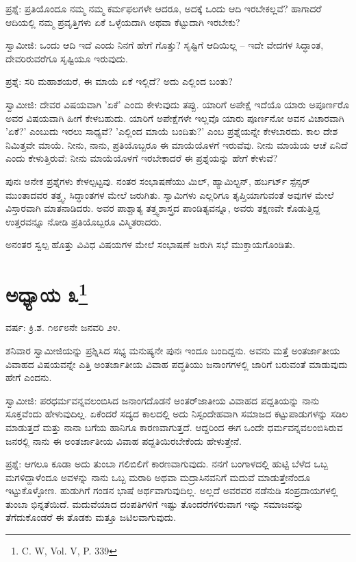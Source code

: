 ಪ್ರಶ್ನೆ: ಪ್ರತಿಯೊಂದೂ ನಮ್ಮ ನಮ್ಮ ಕರ್ಮಫಲಗಳೇ ಆದರೂ, ಅದಕ್ಕೆ ಒಂದು ಆದಿ ಇರಬೇಕಲ್ಲವೆ? ಹಾಗಾದರೆ ಆದಿಯಲ್ಲಿ ನಮ್ಮ ಪ್ರವೃತ್ತಿಗಳು ಏಕೆ ಒಳ್ಳೆಯದಾಗಿ ಅಥವಾ ಕೆಟ್ಟುದಾಗಿ ಇರಬೇಕು?

ಸ್ವಾಮೀಜಿ: ಒಂದು ಆದಿ ಇದೆ ಎಂದು ನಿನಗೆ ಹೇಗೆ ಗೊತ್ತು? ಸೃಷ್ಟಿಗೆ ಆದಿಯಿಲ್ಲ – ಇದೇ ವೇದಗಳ ಸಿದ್ಧಾಂತ, ದೇವರಿರುವರೆಗೂ ಸೃಷ್ಟಿಯೂ ಇರುವುದು.

ಪ್ರಶ್ನೆ: ಸರಿ ಮಹಾಶಯರೆ, ಈ ಮಾಯೆ ಏಕೆ ಇಲ್ಲಿದೆ? ಅದು ಎಲ್ಲಿಂದ ಬಂತು?

ಸ್ವಾಮೀಜಿ: ದೇವರ ವಿಷಯವಾಗಿ 'ಏಕೆ' ಎಂದು ಕೇಳುವುದು ತಪ್ಪು. ಯಾರಿಗೆ ಅಪೇಕ್ಷೆ ಇದೆಯೊ ಯಾರು ಅಪೂರ್ಣರೊ ಅವರ ವಿಷಯವಾಗಿ ಹೀಗೆ ಕೇಳಬಹುದು. ಯಾರಿಗೆ ಅಪೇಕ್ಷೆಗಳೇ ಇಲ್ಲವೊ ಯಾರು ಪೂರ್ಣನೋ ಅವನ ವಿಚಾರವಾಗಿ 'ಏಕೆ?' ಎಂಬುದು ಇರಲು ಸಾಧ್ಯವೆ? 'ಎಲ್ಲಿಂದ ಮಾಯೆ ಬಂದಿತು?' ಎಂಬ ಪ್ರಶ್ನೆಯನ್ನೇ ಕೇಳಬಾರದು. ಕಾಲ ದೇಶ ನಿಮಿತ್ತವೇ ಮಾಯೆ. ನೀನು, ನಾನು, ಪ್ರತಿಯೊಬ್ಬರೂ ಈ ಮಾಯೆಯೊಳಗೆ ಇರುವೆವು. ನೀನು ಮಾಯೆಯ ಆಚೆ ಏನಿದೆ ಎಂದು ಕೇಳುತ್ತಿರುವೆ: ನೀನು ಮಾಯೆಯೊಳಗೆ ಇರಬೇಕಾದರೆ ಈ ಪ್ರಶ್ನೆಯನ್ನು ಹೇಗೆ ಕೇಳುವೆ?

ಪುನಃ ಅನೇಕ ಪ್ರಶ್ನೆಗಳು ಕೇಳಲ್ಪಟ್ಟವು. ನಂತರ ಸಂಭಾಷಣೆಯು ಮಿಲ್, ಹ್ಯಾಮಿಲ್ಟನ್, ಹರ್ಬರ್ಟ್ ಸ್ಪೆನ್ಸರ್ ಮುಂತಾದವರ ತತ್ತ್ವ, ಸಿದ್ಧಾಂತಗಳ ಮೇಲೆ ಜರುಗಿತು. ಸ್ವಾಮಿಗಳು ಎಲ್ಲರಿಗೂ ತೃಪ್ತಿಯಾಗುವಂತೆ ಅವುಗಳ ಮೇಲೆ ವಿಸ್ತಾರವಾಗಿ ಮಾತನಾಡಿದರು. ಅವರ ಪಾಶ್ಚಾತ್ಯ ತತ್ತ್ವಶಾಸ್ತ್ರದ ಪಾಂಡಿತ್ಯವನ್ನೂ, ಅವರು ತಕ್ಷಣವೇ ಕೊಡುತ್ತಿದ್ದ ಉತ್ತರವನ್ನೂ ನೋಡಿ ಪ್ರತಿಯೊಬ್ಬರೂ ವಿಸ್ಮಿತರಾದರು.

ಅನಂತರ ಸ್ವಲ್ಪ ಹೊತ್ತು ವಿವಿಧ ವಿಷಯಗಳ ಮೇಲೆ ಸಂಭಾಷಣೆ ಜರುಗಿ ಸಭೆ ಮುಕ್ತಾಯಗೊಂಡಿತು.

\newpage

\chapter[ಅಧ್ಯಾಯ ೩]{ಅಧ್ಯಾಯ ೩\protect\footnote{\engfoot{} C. W, Vol. V, P. 339}}

\begin{center}
ವರ್ಷ: ಕ್ರಿ.ಶ. ೧೮೯೮ನೇ ಜನವರಿ ೨೪.
\end{center}

ಶನಿವಾರ ಸ್ವಾಮೀಜಿಯನ್ನು ಪ್ರಶ್ನಿಸಿದ ಸಭ್ಯ ಮನುಷ್ಯನೇ ಪುನಃ ಇಂದೂ ಬಂದಿದ್ದನು. ಅವನು ಮತ್ತೆ ಅಂತರ್ಜಾತೀಯ ವಿವಾಹದ ವಿಷಯವನ್ನೇ ಎತ್ತಿ ಅಂತರ್ಜಾತೀಯ ವಿವಾಹ ಪದ್ಧತಿಯು ಜನಾಂಗಗಳಲ್ಲಿ ಜಾರಿಗೆ ಬರುವಂತೆ ಮಾಡುವುದು ಹೇಗೆ ಎಂದನು.

ಸ್ವಾಮೀಜಿ: ಪರಧರ್ಮವನ್ನವಲಂಬಿಸಿದ ಜನಾಂಗದೊಡನೆ ಅಂತರ್‌ಜಾತೀಯ ವಿವಾಹದ ಪದ್ದತಿಯನ್ನು ನಾನು ಸೂಕ್ತವೆಂದು ಹೇಳುವುದಿಲ್ಲ. ಏಕೆಂದರೆ ಸದ್ಯದ ಕಾಲದಲ್ಲಿ ಅದು ನಿಸ್ಸಂದೇಹವಾಗಿ ಸಮಾಜದ ಕಟ್ಟುಪಾಡುಗಳನ್ನು ಸಡಿಲ ಮಾಡುತ್ತದೆ ಮತ್ತು ನಾನಾ ಬಗೆಯ ಹಾನಿಗೂ ಕಾರಣವಾಗುತ್ತದೆ. ಆದ್ದರಿಂದ ಈಗ ಒಂದೇ ಧರ್ಮವನ್ನವಲಂಬಿಸಿರುವ ಜನರಲ್ಲಿ ನಾನು ಈ ಅಂತರ್ಜಾತೀಯ ವಿವಾಹ ಪದ್ದತಿಯಿರಬೇಕೆಂದು ಹೇಳುತ್ತೇನೆ.

ಪ್ರಶ್ನೆ: ಆಗಲೂ ಕೂಡಾ ಅದು ತುಂಬಾ ಗಲಿಬಿಲಿಗೆ ಕಾರಣವಾಗುವುದು. ನನಗೆ ಬಂಗಾಳದಲ್ಲಿ ಹುಟ್ಟಿ ಬೆಳೆದ ಒಬ್ಬ ಮಗಳಿದ್ದಾಳೆಂದೂ ಅವಳನ್ನು ನಾನು ಒಬ್ಬ ಮರಾಠಿ ಅಥವಾ ಮದ್ರಾಸಿನವನಿಗೆ ಮದುವೆ ಮಾಡುತ್ತೇನೆಂದೂ ಇಟ್ಟುಕೊಳ್ಳೋಣ. ಹುಡುಗಿಗೆ ಗಂಡನ ಭಾಷೆ ಅರ್ಥವಾಗುವುದಿಲ್ಲ. ಅಲ್ಲದೆ ಅವರವರ ನಡೆನುಡಿ ಸಂಪ್ರದಾಯಗಳಲ್ಲಿ ತುಂಬಾ ಭಿನ್ನತೆಯಿದೆ. ಮದುವೆಯಾದ ದಂಪತಿಗಳಿಗೆ ಇಷ್ಟು ತೊಂದರೆಗಳಿರುವಾಗ ಇನ್ನು ಸಮಾಜವನ್ನು ತೆಗೆದುಕೊಂಡರೆ ಈ ತೊಡಕು ಮತ್ತೂ ಜಟಿಲವಾಗುವುದು.

